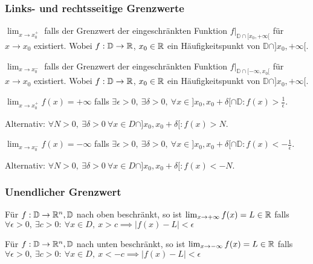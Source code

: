 \subsubsection{Links- und rechtsseitige Grenzwerte}
\begin{compactdesc}
    \item[Rechtsseitiger Grenzwert:] $\lim_{x \to x_0^+}$ falls der Grenzwert der eingeschränkten Funktion $f|_{\mathbb{D} \cap [x_0, +\infty[}$ für $x \to x_0$ existiert. Wobei $f:\mathbb{D} \to \mathbb{R}$, $x_0 \in \mathbb{R}$ ein Häufigkeitspunkt von $\mathbb{D} \cap ]x_0, + \infty[$.
    \item[Linksseitiger Grenzwert:] $\lim_{x \to x_0^-}$ falls der Grenzwert der eingeschränkten Funktion $f|_{\mathbb{D} \cap [-\infty, x_0[}$ für $x \to x_0$ existiert. Wobei $f:\mathbb{D} \to \mathbb{R}$, $x_0 \in \mathbb{R}$ ein Häufigkeitspunkt von $\mathbb{D} \cap ]x_0, + \infty[$.
    \item[Erweitert Rechts:] $\lim_{x \to x_0^+} f(x) = +\infty$ falls $\exists \epsilon > 0, \ \exists \delta > 0, \ \forall x \in ]x_0, x_0 + \delta[ \cap \mathbb{D} : f(x) > \frac{1}{\epsilon}$.
        \begin{compactitem}
        \item Alternativ: $\forall N > 0, \ \exists \delta > 0 \ \forall x \in D \cap ]x_0, x_0 + \delta[ : f(x) > N$.
        \end{compactitem}
    \item[Erweitert Links:] $\lim_{x \to x_0^-} f(x) = -\infty$ falls $\exists \epsilon > 0, \ \exists \delta > 0, \ \forall x \in ]x_0, x_0 + \delta[ \cap \mathbb{D} : f(x) < -\frac{1}{\epsilon}$.
        \begin{compactitem}
        \item Alternativ: $\forall N > 0, \ \exists \delta > 0 \ \forall x \in D \cap ]x_0, x_0 + \delta[ : f(x) < -N$.
        \end{compactitem}
\end{compactdesc}

\subsubsection{Unendlicher Grenzwert}
\begin{compactdesc}
    \item[Oben:] Für $f: \mathbb{D} \to \mathbb{R}^n, \mathbb{D}$ nach oben beschränkt, so ist $\lim_{x \to +\infty} f(x) = L \in \mathbb{R}$ falls $\forall \epsilon > 0, \ \exists c > 0: \ \forall x \in D, \ x > c \implies |f(x) - L| < \epsilon$
    \item[Unten] Für $f: \mathbb{D} \to \mathbb{R}^n, \mathbb{D}$ nach unten beschränkt, so ist $\lim_{x \to -\infty} f(x) = L \in \mathbb{R}$ falls $\forall \epsilon > 0, \ \exists c > 0: \ \forall x \in D, \ x < -c \implies |f(x) - L| < \epsilon$
\end{compactdesc}
